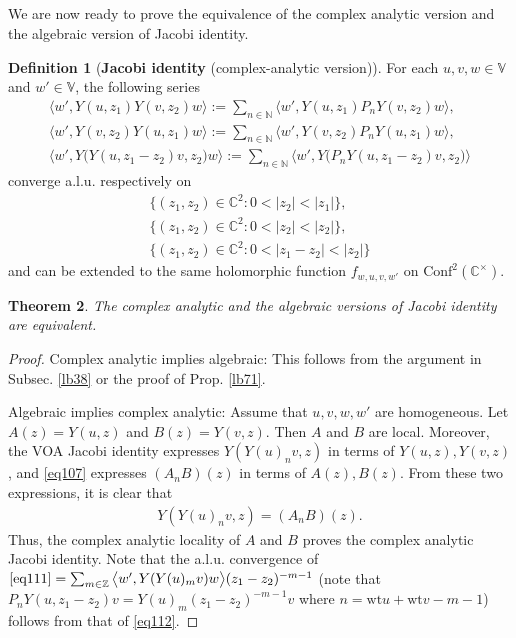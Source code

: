 \documentclass[12pt,a4paper,notitlepage]{article}
\theoremstyle{definition}
\newtheorem{df}{Definition}[section]
\theoremstyle{plain}
\newtheorem{thm}[df]{Theorem}
\newcommand{\Conf}{\mathrm{Conf}}
\newcommand{\bigbk}[1]{\big\langle {#1}\big\rangle}
\newcommand{\Vbb}{\mathbb V}
\newcommand{\Cbb}{\mathbb C}
\newcommand{\Nbb}{\mathbb N}
\newcommand{\Zbb}{\mathbb Z}
\newcommand{\wt}{\mathrm{wt}}
\numberwithin{equation}{section}
\begin{document}
\subsection{}

We are now ready to prove the equivalence of the complex analytic version and the algebraic version of Jacobi identity.

\begin{df}[\textbf{Jacobi identity} (complex-analytic version)]\label{lb194} 
For each $u,v,w\in\Vbb$ and $w'\in\Vbb$, the following series
\begin{subequations}
\begin{gather}
\bigbk{w',Y(u,z_1)Y(v,z_2)w}:=\sum_{n\in\Nbb}\bigbk{w',Y(u,z_1)P_nY(v,z_2)w},\label{eq109}\\
\bigbk{w',Y(v,z_2)Y(u,z_1)w}:=\sum_{n\in\Nbb}\bigbk{w',Y(v,z_2)P_nY(u,z_1)w},\label{eq110}\\
\bigbk{w',Y\big(Y(u,z_1-z_2)v,z_2\big)w}:=\sum_{n\in\Nbb}\bigbk{w',Y\big(P_nY(u,z_1-z_2)v,z_2\big)}\label{eq111}
\end{gather}	
\end{subequations}
converge a.l.u. respectively on
\begin{subequations}
\begin{gather}
\{(z_1,z_2)\in\Cbb^2:0<|z_2|<|z_1|\},\\
\{(z_1,z_2)\in\Cbb^2:0<|z_2|<|z_2|\},\\
\{(z_1,z_2)\in\Cbb^2:0<|z_1-z_2|<|z_2|\}
\end{gather}	
\end{subequations}
and can be extended to the same holomorphic function $f_{w,u,v,w'}$ on $\Conf^2(\Cbb^\times)$.
\end{df}

\begin{thm}
The complex analytic and the algebraic versions of Jacobi identity are equivalent.
\end{thm}

\begin{proof}
Complex analytic implies algebraic: This follows from the argument in Subsec. \ref{lb38} or the proof of Prop. \ref{lb71}.

Algebraic implies complex analytic: Assume that $u,v,w,w'$ are homogeneous. Let $A(z)=Y(u,z)$ and $B(z)=Y(v,z)$. Then $A$ and $B$ are local. Moreover, the VOA Jacobi identity expresses $Y(Y(u)_nv,z)$ in terms of $Y(u,z),Y(v,z)$, and \eqref{eq107} expresses $(A_nB)(z)$ in terms of $A(z),B(z)$. From these two expressions, it is clear that
\begin{align}
Y(Y(u)_nv,z)=(A_nB)(z).	\label{eq118}
\end{align}
Thus, the complex analytic locality of $A$ and $B$ proves the complex analytic Jacobi identity. Note that the a.l.u. convergence of $\eqref{eq111}=\sum_{m\in\Zbb}\bigbk{w',Y(Y(u)_mv)w}(z_1-z_2)^{-m-1}$ (note that $P_n Y(u,z_1-z_2)v=Y(u)_m(z_1-z_2)^{-m-1}v$ where $n=\wt u+\wt v-m-1$) follows from that of \eqref{eq112}.
\end{proof}
\end{document}
